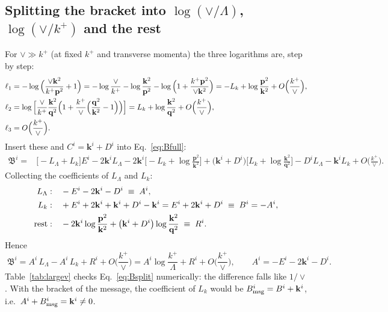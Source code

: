 \documentclass[10pt]{article}
\numberwithin{equation}{section}
\newcommand{\bk}{\mathbf k}
\newcommand{\bp}{\mathbf p}
\newcommand{\bq}{\mathbf q}
\begin{document}
\subsection{Splitting the bracket into \texorpdfstring{$\log(\vee/\Lambda)$}{log(vee/Lambda)}, \texorpdfstring{$\log(\vee/k^+)$}{log(vee/k+)} and the rest}\label{sec:ft-split}
For $\vee\gg k^+$ (at fixed $k^+$ and transverse momenta) the three logarithms are, step by step:
\begin{align}
\ell_1&=-\log\Big(\frac{\vee\bk^2}{k^+\bp^2}+1\Big)=-\log\frac{\vee}{k^+}-\log\frac{\bk^2}{\bp^2}-\log\Big(1+\frac{k^+\bp^2}{\vee\bk^2}\Big)=-L_k+\log\frac{\bp^2}{\bk^2}+O\Big(\frac{k^+}{\vee}\Big),\notag\\
\ell_2&=\log\Big[\frac{\vee}{k^+}\frac{\bk^2}{\bq^2}\Big(1+\frac{k^+}{\vee}\Big(\frac{\bq^2}{\bk^2}-1\Big)\Big)\Big]=L_k+\log\frac{\bk^2}{\bq^2}+O\Big(\frac{k^+}{\vee}\Big),\notag\\
\ell_3&=O\Big(\frac{k^+}{\vee}\Big).
\end{align}
Insert these and $C^i=\bk^i+D^i$ into Eq.~\eqref{eq:Bfull}:
\begin{align}
\mathfrak B^i={}&\big[-L_\Lambda+L_k\big]E^i-2\bk^iL_\Lambda-2\bk^i\Big[-L_k+\log\frac{\bp^2}{\bk^2}\Big]+\big(\bk^i+D^i\big)\Big[L_k+\log\frac{\bk^2}{\bq^2}\Big]-D^iL_\Lambda-\bk^iL_k+O\Big(\frac{k^+}{\vee}\Big).
\end{align}
Collecting the coefficients of $L_\Lambda$ and $L_k$:
\begin{align}
L_\Lambda:&\quad -E^i-2\bk^i-D^i\;\equiv\;A^i,\notag\\
L_k:&\quad +E^i+2\bk^i+\bk^i+D^i-\bk^i=E^i+2\bk^i+D^i\;\equiv\;B^i=-A^i,\notag\\
\text{rest}:&\quad -2\bk^i\log\frac{\bp^2}{\bk^2}+\big(\bk^i+D^i\big)\log\frac{\bk^2}{\bq^2}\;\equiv\;R^i.
\end{align}
Hence
\begin{equation}
\boxed{\;\mathfrak B^i=A^i\,L_\Lambda-A^i\,L_k+R^i+O\Big(\frac{k^+}{\vee}\Big)=A^i\log\frac{k^+}{\Lambda}+R^i+O\Big(\frac{k^+}{\vee}\Big),\qquad A^i=-E^i-2\bk^i-D^i .\;}
\label{eq:Bsplit}
\end{equation}
Table~\ref{tab:largev} checks Eq.~\eqref{eq:Bsplit} numerically: the difference falls like $1/\vee$. With the bracket of the message, the coefficient of $L_k$ would be $B^i_{\rm msg}=B^i+\bk^i$, i.e.\ $A^i+B^i_{\rm msg}=\bk^i\neq0$.
\end{document}
